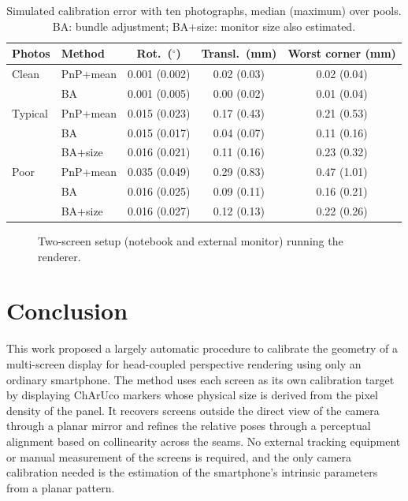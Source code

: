 \documentclass[english,hidelinks]{sbrt}
\begin{document}
\begin{table}[t]
\centering
\small
\caption{Simulated calibration error with ten photographs, median (maximum) over pools. BA: bundle adjustment; BA+size: monitor size also estimated.}
\label{tab:sim}
\setlength{\tabcolsep}{3pt}
\begin{tabular}{llccc}
\hline
Photos & Method & Rot.\ ($^\circ$) & Transl.\ (mm) & Worst corner (mm) \\
\hline
Clean   & PnP+mean & 0.001 (0.002) & 0.02 (0.03) & 0.02 (0.04) \\
        & BA       & 0.001 (0.005) & 0.00 (0.02) & 0.01 (0.04) \\
Typical & PnP+mean & 0.015 (0.023) & 0.17 (0.43) & 0.21 (0.53) \\
        & BA       & 0.015 (0.017) & 0.04 (0.07) & 0.11 (0.16) \\
        & BA+size  & 0.016 (0.021) & 0.11 (0.16) & 0.23 (0.32) \\
Poor    & PnP+mean & 0.035 (0.049) & 0.29 (0.83) & 0.47 (1.01) \\
        & BA       & 0.016 (0.025) & 0.09 (0.11) & 0.16 (0.21) \\
        & BA+size  & 0.016 (0.027) & 0.12 (0.13) & 0.22 (0.26) \\
\hline
\end{tabular}
\end{table}

\begin{figure}[t]
\centering
{}
\caption{Two-screen setup (notebook and external monitor) running the renderer.}
\label{fig:print}
\end{figure}

\section{Conclusion}
\label{sec:V}

This work proposed a largely automatic procedure to calibrate the geometry of a multi-screen display for head-coupled perspective rendering using only an ordinary smartphone. The method uses each screen as its own calibration target by displaying ChArUco markers whose physical size is derived from the pixel density of the panel. It recovers screens outside the direct view of the camera through a planar mirror and refines the relative poses through a perceptual alignment based on collinearity across the seams. No external tracking equipment or manual measurement of the screens is required, and the only camera calibration needed is the estimation of the smartphone's intrinsic parameters from a planar pattern.
\end{document}
